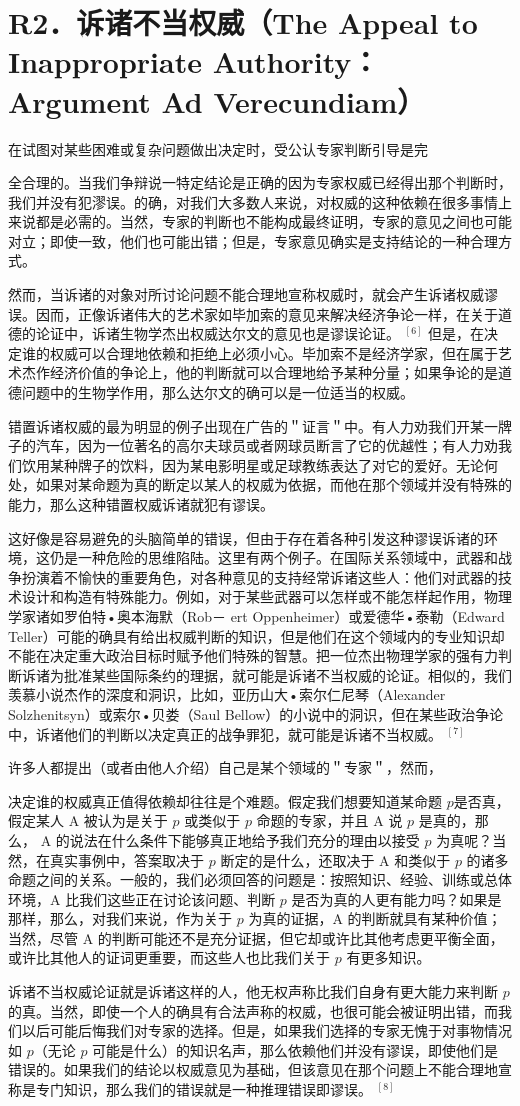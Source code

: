 \section*{R2．诉诸不当权威（The Appeal to Inappropriate Authority：Argument Ad Verecundiam）}
在试图对某些困难或复杂问题做出决定时，受公认专家判断引导是完

全合理的。当我们争辩说一特定结论是正确的因为专家权威已经得出那个判断时，我们并没有犯漻误。的确，对我们大多数人来说，对权威的这种依赖在很多事情上来说都是必需的。当然，专家的判断也不能构成最终证明，专家的意见之间也可能对立；即使一致，他们也可能出错；但是，专家意见确实是支持结论的一种合理方式。

然而，当诉诸的对象对所讨论问题不能合理地宣称权威时，就会产生诉诸权威谬误。因而，正像诉诸伟大的艺术家如毕加索的意见来解决经济争论一样，在关于道德的论证中，诉诸生物学杰出权威达尔文的意见也是谬误论证。 ${ }^{[6]}$ 但是，在决定谁的权威可以合理地依赖和拒绝上必须小心。毕加索不是经济学家，但在属于艺术杰作经济价值的争论上，他的判断就可以合理地给予某种分量；如果争论的是道德问题中的生物学作用，那么达尔文的确可以是一位适当的权威。

错置诉诸权威的最为明显的例子出现在广告的＂证言＂中。有人力劝我们开某一牌子的汽车，因为一位著名的高尔夫球员或者网球员断言了它的优越性；有人力劝我们饮用某种牌子的饮料，因为某电影明星或足球教练表达了对它的爱好。无论何处，如果对某命题为真的断定以某人的权威为依据，而他在那个领域并没有特殊的能力，那么这种错置权威诉诸就犯有谬误。

这好像是容易避免的头脑简单的错误，但由于存在着各种引发这种谬误诉诸的环境，这仍是一种危险的思维陷陆。这里有两个例子。在国际关系领域中，武器和战争扮演着不愉快的重要角色，对各种意见的支持经常诉诸这些人：他们对武器的技术设计和构造有特殊能力。例如，对于某些武器可以怎样或不能怎样起作用，物理学家诸如罗伯特•奥本海默（Rob－ ert Oppenheimer）或爱德华•泰勒（Edward Teller）可能的确具有给出权威判断的知识，但是他们在这个领域内的专业知识却不能在决定重大政治目标时赋予他们特殊的智慧。把一位杰出物理学家的强有力判断诉诸为批准某些国际条约的理据，就可能是诉诸不当权威的论证。相似的，我们羡慕小说杰作的深度和洞识，比如，亚历山大•索尔仁尼琴（Alexander Solzhenitsyn）或索尔•贝娄（Saul Bellow）的小说中的洞识，但在某些政治争论中，诉诸他们的判断以决定真正的战争罪犯，就可能是诉诸不当权威。 ${ }^{[7]}$

许多人都提出（或者由他人介绍）自己是某个领域的＂专家＂，然而，

决定谁的权威真正值得依赖却往往是个难题。假定我们想要知道某命题 $p$是否真，假定某人 A 被认为是关于 $p$ 或类似于 $p$ 命题的专家，并且 A 说 $p$ 是真的，那么， A 的说法在什么条件下能够真正地给予我们充分的理由以接受 $p$ 为真呢？当然，在真实事例中，答案取决于 $p$ 断定的是什么，还取决于 A 和类似于 $p$ 的诸多命题之间的关系。一般的，我们必须回答的问题是：按照知识、经验、训练或总体环境，A 比我们这些正在讨论该问题、判断 $p$ 是否为真的人更有能力吗？如果是那样，那么，对我们来说，作为关于 $p$ 为真的证据，A 的判断就具有某种价值；当然，尽管 A 的判断可能还不是充分证据，但它却或许比其他考虑更平衡全面，或许比其他人的证词更重要，而这些人也比我们关于 $p$ 有更多知识。

诉诸不当权威论证就是诉诸这样的人，他无权声称比我们自身有更大能力来判断 $p$ 的真。当然，即使一个人的确具有合法声称的权威，也很可能会被证明出错，而我们以后可能后悔我们对专家的选择。但是，如果我们选择的专家无愧于对事物情况如 $p$（无论 $p$ 可能是什么）的知识名声，那么依赖他们并没有谬误，即使他们是错误的。如果我们的结论以权威意见为基础，但该意见在那个问题上不能合理地宣称是专门知识，那么我们的错误就是一种推理错误即谬误。 ${ }^{[8]}$ 
